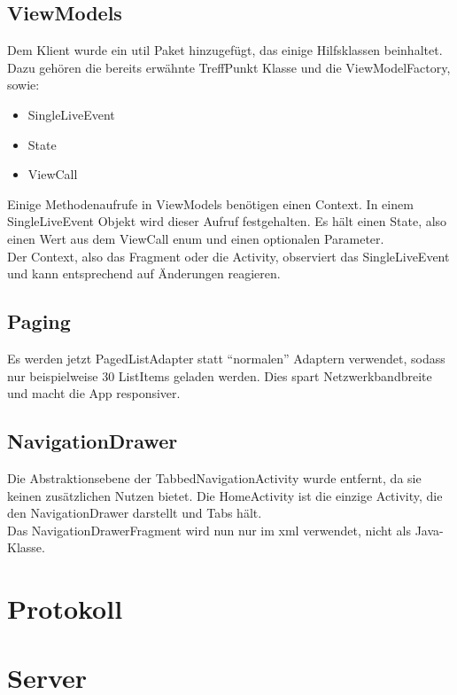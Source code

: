 \documentclass[parskip=full,11pt]{scrartcl}
\begin{document}
\subsection{ViewModels}
Dem Klient wurde ein util Paket hinzugefügt, das einige Hilfsklassen beinhaltet.\\
Dazu gehören die bereits erwähnte TreffPunkt Klasse und die
ViewModelFactory, sowie:
\begin{itemize}
\item
SingleLiveEvent

\item
State

\item
ViewCall

\end{itemize} 
Einige Methodenaufrufe in ViewModels benötigen einen Context. In einem
SingleLiveEvent Objekt wird dieser Aufruf festgehalten. Es hält einen State,
also einen Wert aus dem ViewCall enum und einen optionalen Parameter.\\
Der Context, also das Fragment oder die Activity, observiert das SingleLiveEvent und
kann entsprechend auf Änderungen reagieren.


\subsection{Paging}
Es werden jetzt PagedListAdapter statt \enquote{normalen} Adaptern verwendet,
sodass nur beispielweise 30 ListItems geladen werden. Dies spart Netzwerkbandbreite
und macht die App responsiver.

\subsection{NavigationDrawer}
Die Abstraktionsebene der TabbedNavigationActivity wurde entfernt, da
sie keinen zusätzlichen Nutzen bietet. Die HomeActivity ist die einzige
Activity, die den NavigationDrawer darstellt und Tabs hält.\\
Das NavigationDrawerFragment wird nun nur im xml verwendet, nicht als Java-Klasse.


\pagebreak
\section{Protokoll}


\pagebreak
\section{Server}
\end{document}
